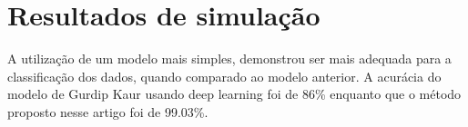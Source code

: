 \section{Resultados de simulação}

A utilização de um modelo mais simples, demonstrou ser mais adequada para a 
classificação dos dados, quando comparado ao modelo anterior. A acurácia 
do modelo de Gurdip Kaur usando deep learning foi de 86\% enquanto que o 
método proposto nesse artigo foi de 99.03\%.